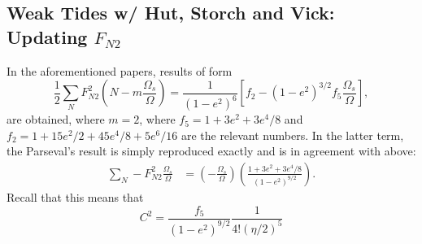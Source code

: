 \documentclass[11pt,
        usenames, %
        dvipsnames %
    ]{article}
\newcommand*{\p}[1]{\left(#1\right)}
\newcommand*{\s}[1]{\left[#1\right]}
\begin{document}
\subsection{Weak Tides w/ Hut, Storch and Vick: Updating $F_{N2}$}

In the aforementioned papers, results of form
\begin{equation}
    \frac{1}{2}\sum\limits_{N}F_{N2}^2 \p{N - m\frac{\Omega_s}{\Omega}}
        = \frac{1}{\p{1 - e^2}^6}\s{f_2 - \p{1 - e^2}^{3/2}
            f_5\frac{\Omega_s}{\Omega}},
\end{equation}
are obtained, where $m = 2$, where $f_5 = 1 + 3e^2 + 3e^4/8$ and $f_2 = 1 +
15e^2/2 + 45e^4/8 + 5e^6/16$ are the relevant numbers. In the latter term, the
Parseval's result is simply reproduced exactly and is in agreement with above:
\begin{align}
    \sum\limits_N -F_{N2}^2\frac{\Omega_s}{\Omega}
        &= \p{-\frac{\Omega_s}{\Omega}}\p{\frac{1 + 3e^2 + 3e^4/8}{
            \p{1 - e^2}^{9/2}}}.
\end{align}
Recall that this means that
\begin{equation}
    C^2 = \frac{f_5}{\p{1 - e^2}^{9/2}}\frac{1}{4!\p{\eta/2}^5}
\end{equation}
\end{document}
